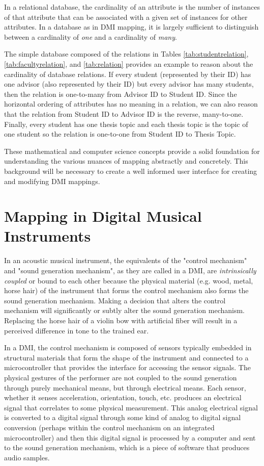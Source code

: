 In a relational database, the cardinality of an attribute is the number of instances of that attribute that can be associated with a given set of instances for other attributes. In a database as in DMI mapping, it is largely sufficient to distinguish between a cardinality of \emph{one} and a cardinality of \emph{many}.

The simple database composed of the relations in Tables \ref{tab:studentrelation}, \ref{tab:facultyrelation}, and \ref{tab:relation} provides an example to reason about the cardinality of database relations. If every student (represented by their ID) has one advisor (also represented by their ID) but every advisor has many students, then the relation is one-to-many from Advisor ID to Student ID. Since the horizontal ordering of attributes has no meaning in a relation, we can also reason that the relation from Student ID to Advisor ID is the reverse, many-to-one. Finally, every student has one thesis topic and each thesis topic is the topic of one student so the relation is one-to-one from Student ID to Thesis Topic.

These mathematical and computer science concepts provide a solid foundation for understanding the various nuances of mapping abstractly and concretely. This background will be necessary to create a well informed user interface for creating and modifying DMI mappings.

\section{Mapping in Digital Musical Instruments}
\label{sec:Importance of Mapping}

In an acoustic musical instrument, the equivalents of the "control mechanism" and "sound generation mechanism", as they are called in a DMI, are \emph{intrinsically coupled} or bound to each other because the physical material (e.g. wood, metal, horse hair) of the instrument that forms the control mechanism also forms the sound generation mechanism. Making a decision that alters the control mechanism will significantly or subtly alter the sound generation mechanism. Replacing the horse hair of a violin bow with artificial fiber will result in a perceived difference in tone to the trained ear.

In a DMI, the control mechanism is composed of sensors typically embedded in structural materials that form the shape of the instrument and connected to a microcontroller that provides the interface for accessing the sensor signals. The physical gestures of the performer are not coupled to the sound generation through purely mechanical means, but through electrical means. Each sensor, whether it senses acceleration, orientation, touch, etc. produces an electrical signal that correlates to some physical measurement. This analog electrical signal is converted to a digital signal through some kind of analog to digital signal conversion (perhaps within the control mechanism on an integrated microcontroller) and then this digital signal is processed by a computer and sent to the sound generation mechanism, which is a piece of software that produces audio samples.

